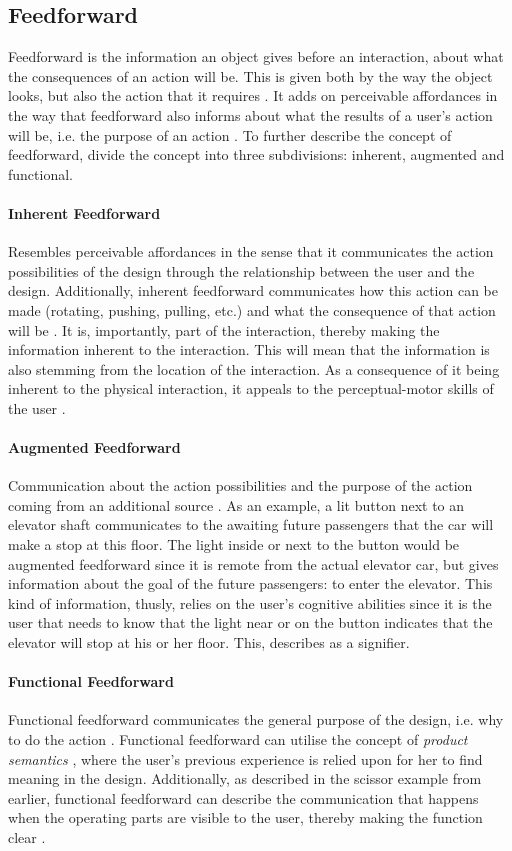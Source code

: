 \subsection{Feedforward} Feedforward is the information an object gives before an interaction, about what the consequences of an action will be. This is given both by the way the object looks, but also the action that it requires \cite{frogger}. It adds on perceivable affordances in the way that feedforward also informs about what the results of a user's action will be, i.e. the purpose of an action \cite{vermeulen}. To further describe the concept of feedforward,  divide the concept into three subdivisions: inherent, augmented and functional.
\paragraph{Inherent Feedforward} Resembles perceivable affordances \cite{norman} in the sense that it communicates the action possibilities of the design through the relationship between the user and the design. Additionally, inherent feedforward communicates how this action can be made (rotating, pushing, pulling, etc.) and what the consequence of that action will be \cite{frogger}. It is, importantly, part of the interaction, thereby making the information inherent to the interaction. This will mean that the information is also stemming from the location of the interaction. As a consequence of it being inherent to the physical interaction, it appeals to the perceptual-motor skills of the user \cite{frogger}.
\paragraph{Augmented Feedforward} Communication about the action possibilities and the purpose of the action coming from an additional source \cite{frogger}. As an example, a lit button next to an elevator shaft communicates to the awaiting future passengers that the car will make a stop at this floor. The light inside or next to the button would be augmented feedforward since it is remote from the actual elevator car, but gives information about the goal of the future passengers: to enter the elevator. This kind of information, thusly, relies on the user's cognitive abilities since it is the user that needs to know that the light near or on the button indicates that the elevator will stop at his or her floor. This,  describes as a signifier.
\paragraph{Functional Feedforward} Functional feedforward communicates the general purpose of the design, i.e. why to do the action \cite{frogger}. Functional feedforward can utilise the concept of \textit{product semantics} \cite{semantics}, where the user's previous experience is relied upon for her to find meaning in the design. Additionally, as described in the scissor example from earlier, functional feedforward can describe the communication that happens when the operating parts are visible to the user, thereby making the function clear \cite{frogger}.

